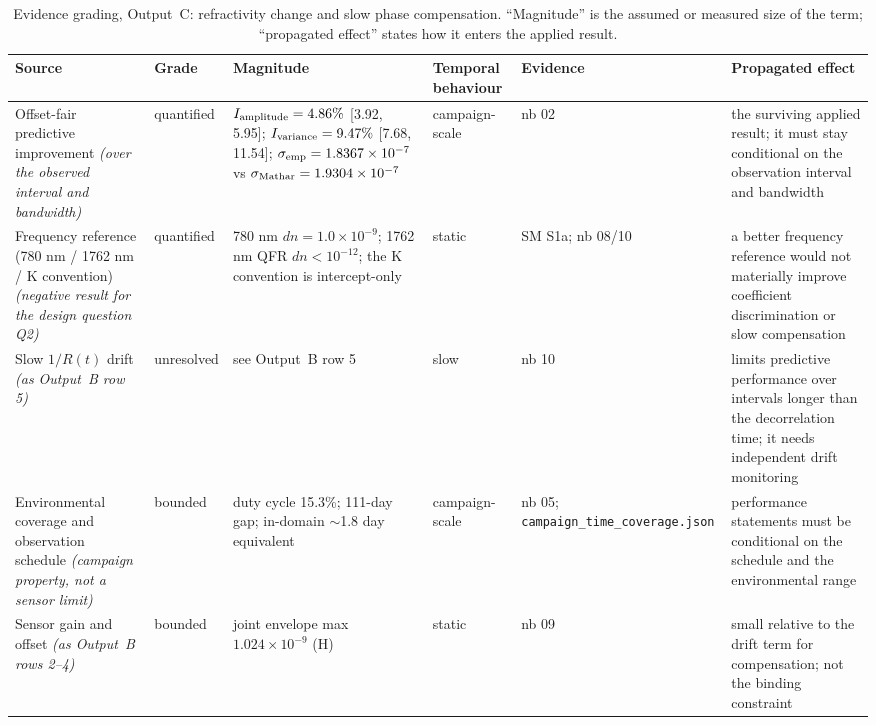 \begin{table}[htbp]
\centering
\caption{Evidence grading, Output~C: refractivity change and slow phase compensation. ``Magnitude'' is the assumed or measured size of the term; ``propagated effect'' states how it enters the applied result.}
\label{tab:S4c}
\footnotesize
\setlength{\tabcolsep}{4pt}
\begin{tabular}{@{}p{}p{}p{}p{}p{}p{}@{}}
\hline
\textbf{Source} & \textbf{Grade} & \textbf{Magnitude} & \textbf{Temporal behaviour} & \textbf{Evidence} & \textbf{Propagated effect} \\
\hline
Offset-fair predictive improvement \emph{(over the observed interval and bandwidth)} & quantified & $I_{\rm amplitude} = 4.86\%$ [3.92, 5.95]; $I_{\rm variance} = 9.47\%$ [7.68, 11.54]; $\sigma_{\rm emp} = 1.8367\times10^{-7}$ vs $\sigma_{\rm Mathar} = 1.9304\times10^{-7}$ & campaign-scale & nb 02 & the surviving applied result; it must stay conditional on the observation interval and bandwidth \\
Frequency reference (780 nm / 1762 nm / K convention) \emph{(negative result for the design question Q2)} & quantified & 780 nm $dn = 1.0\times10^{-9}$; 1762 nm QFR $dn < 10^{-12}$; the K convention is intercept-only & static & SM S1a; nb 08/10 & a better frequency reference would not materially improve coefficient discrimination or slow compensation \\
Slow $1/R(t)$ drift \emph{(as Output~B row 5)} & unresolved & see Output~B row 5 & slow & nb 10 & limits predictive performance over intervals longer than the decorrelation time; it needs independent drift monitoring \\
Environmental coverage and observation schedule \emph{(campaign property, not a sensor limit)} & bounded & duty cycle 15.3\%; 111-day gap; in-domain $\sim$1.8 day equivalent & campaign-scale & nb 05; \texttt{campaign\_time\_coverage.json} & performance statements must be conditional on the schedule and the environmental range \\
Sensor gain and offset \emph{(as Output~B rows 2--4)} & bounded & joint envelope max $1.024\times10^{-9}$ (H) & static & nb 09 & small relative to the drift term for compensation; not the binding constraint \\
\hline
\end{tabular}
\end{table}
